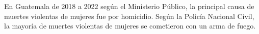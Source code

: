 En Guatemala de 2018 a 2022 según el Ministerio Público, la principal causa de muertes violentas de mujeres fue por homicidio. Según la Policía Nacional Civil, la mayoría de muertes violentas de mujeres se cometieron con un arma de fuego. 